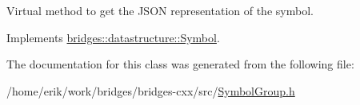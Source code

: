 Virtual method to get the J\+S\+ON representation of the symbol. 



Implements \hyperlink{classbridges_1_1datastructure_1_1_symbol_a8044b3da559dcd9de8510ae339f126c8}{bridges\+::datastructure\+::\+Symbol}.



The documentation for this class was generated from the following file\+:\begin{DoxyCompactItemize}
\item 
/home/erik/work/bridges/bridges-\/cxx/src/\hyperlink{_symbol_group_8h}{Symbol\+Group.\+h}\end{DoxyCompactItemize}

